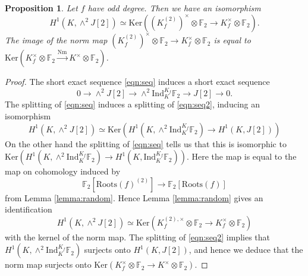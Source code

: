 \documentclass[11pt]{amsart}
\def\F{\mathbb F}
\theoremstyle{plain}
\newtheorem{lemma}{Lemma}
\newtheorem{proposition}{Proposition}
\theoremstyle{definition}
\newcommand{\Roots}{\mathrm{Roots}}
\newcommand{\Ind}{\mathrm{Ind}}
\newcommand{\Nm}{\mathrm{Nm}}
\newcommand{\Ker}{\mathrm{Ker}}
\begin{document}
\begin{proposition}\label{prop:main1}
Let $f$ have odd degree. Then we have an isomorphism
\[
H^1 (K,\wedge ^2 J[2])\simeq \Ker ((K_f ^{(2)})^\times \otimes \F _2 \to K_f ^\times \otimes \F _2 ).
\]
The image of the norm map $(K_f ^{(2)})^\times \otimes \F _2 \to K_f ^\times \otimes \F _2 $ is equal to $\Ker (K_f ^\times \otimes \F _2 \stackrel{\Nm }{\longrightarrow} K^\times \otimes \F _2 )$. 
\end{proposition}
\begin{proof}
The short exact sequence \eqref{eqn:seq} induces a short exact sequence
\begin{equation}\label{eqn:seq2}
0\to \wedge ^2 J[2]\to \wedge ^2 \Ind ^{K_f }_K \F _2 \to J[2]\to 0.
\end{equation}
The splitting of \eqref{eqn:seq} induces a splitting of \eqref{eqn:seq2}, inducing an isomorphism
\[
H^1 (K,\wedge ^2 J[2]) \simeq \Ker (H^1 (K,\wedge ^2 \Ind ^{K_f }_K \F _2 )\to H^1 (K,J[2]))
\]
On the other hand the splitting of \eqref{eqn:seq} tells us that this is isomorphic to $\Ker (H^1 (K,\wedge ^2 \Ind ^{K_f }_K \F _2 )\to H^1 (K,\Ind ^{K_f }_K \F _2 ))$. Here the map is equal to the map on cohomology induced by 
\[
\F _2 [\Roots (f)^{(2)}]\to \F _2 [\Roots (f)]
\]
from Lemma \ref{lemma:random}. Hence Lemma \ref{lemma:random} gives an identification
\[
H^1 (K,\wedge ^2 J[2])\simeq \Ker (K_f ^{(2),\times }\otimes \F _2 \to K_f ^\times \otimes \F _2 )
\]
with the kernel of the norm map. The splitting of \eqref{eqn:seq2} implies that $H^1 (K,\wedge ^2 \Ind ^{K_f }_K \F _2 )$ surjects onto $H^1 (K,J[2])$, and hence we deduce that the norm map surjects onto $\Ker (K_f ^{\times }\otimes \F _2 \to K^\times \otimes \F _2 )$.
\end{proof}
\end{document}
